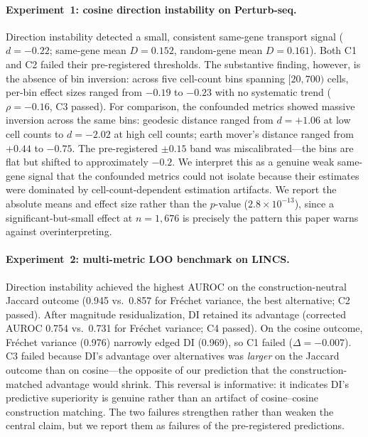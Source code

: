 \paragraph{Experiment~1: cosine direction instability on Perturb-seq.}
Direction instability detected a small, consistent same-gene transport signal ($d = -0.22$; same-gene mean $D = 0.152$, random-gene mean $D = 0.161$).
Both C1 and C2 failed their pre-registered thresholds.
The substantive finding, however, is the absence of bin inversion: across five cell-count bins spanning $[20, 700)$ cells, per-bin effect sizes ranged from $-0.19$ to $-0.23$ with no systematic trend ($\rho = -0.16$, C3 passed).
For comparison, the confounded metrics showed massive inversion across the same bins: geodesic distance ranged from $d = +1.06$ at low cell counts to $d = -2.02$ at high cell counts; earth mover's distance ranged from $+0.44$ to $-0.75$.
The pre-registered $\pm 0.15$ band was miscalibrated---the bins are flat but shifted to approximately $-0.2$.
We interpret this as a genuine weak same-gene signal that the confounded metrics could not isolate because their estimates were dominated by cell-count-dependent estimation artifacts.
We report the absolute means and effect size rather than the $p$-value ($2.8 \times 10^{-13}$), since a significant-but-small effect at $n = 1{,}676$ is precisely the pattern this paper warns against overinterpreting.

\paragraph{Experiment~2: multi-metric LOO benchmark on LINCS.}
Direction instability achieved the highest AUROC on the construction-neutral Jaccard outcome (0.945 vs.\ 0.857 for Fr\'{e}chet variance, the best alternative; C2 passed).
After magnitude residualization, DI retained its advantage (corrected AUROC 0.754 vs.\ 0.731 for Fr\'{e}chet variance; C4 passed).
On the cosine outcome, Fr\'{e}chet variance (0.976) narrowly edged DI (0.969), so C1 failed ($\Delta = -0.007$).
C3 failed because DI's advantage over alternatives was \emph{larger} on the Jaccard outcome than on cosine---the opposite of our prediction that the construction-matched advantage would shrink.
This reversal is informative: it indicates DI's predictive superiority is genuine rather than an artifact of cosine--cosine construction matching.
The two failures strengthen rather than weaken the central claim, but we report them as failures of the pre-registered predictions.

